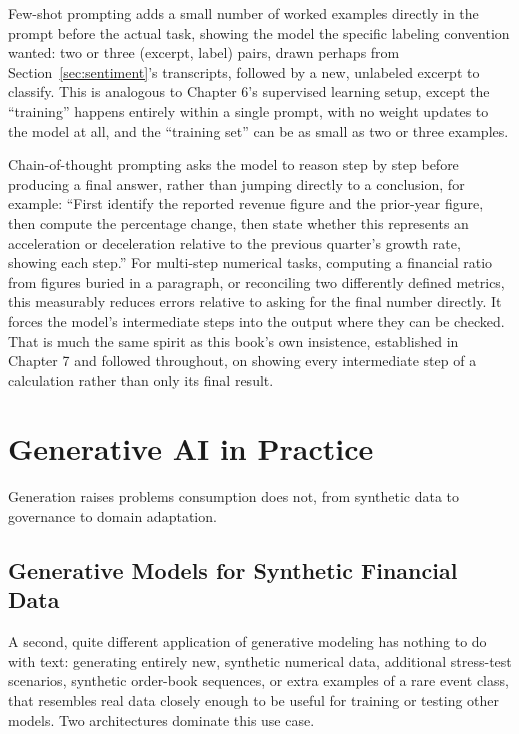\documentclass[../ai_in_finance]{subfiles}
\begin{document}
Few-shot prompting adds a small number of worked examples directly in the prompt before the actual task, showing the model the specific labeling convention wanted: two or three (excerpt, label) pairs, drawn perhaps from Section~\ref{sec:sentiment}'s transcripts, followed by a new, unlabeled excerpt to classify. This is analogous to Chapter 6's supervised learning setup, except the ``training'' happens entirely within a single prompt, with no weight updates to the model at all, and the ``training set'' can be as small as two or three examples.

Chain-of-thought prompting asks the model to reason step by step before producing a final answer, rather than jumping directly to a conclusion, for example: ``First identify the reported revenue figure and the prior-year figure, then compute the percentage change, then state whether this represents an acceleration or deceleration relative to the previous quarter's growth rate, showing each step.'' For multi-step numerical tasks, computing a financial ratio from figures buried in a paragraph, or reconciling two differently defined metrics, this measurably reduces errors relative to asking for the final number directly. It forces the model's intermediate steps into the output where they can be checked. That is much the same spirit as this book's own insistence, established in Chapter 7 and followed throughout, on showing every intermediate step of a calculation rather than only its final result.

\section{Generative AI in Practice}

Generation raises problems consumption does not, from synthetic data to governance to domain adaptation.

\subsection{Generative Models for Synthetic Financial Data}
\label{sec:generative-synthetic}

A second, quite different application of generative modeling has nothing to do with text: generating entirely new, synthetic numerical data, additional stress-test scenarios, synthetic order-book sequences, or extra examples of a rare event class, that resembles real data closely enough to be useful for training or testing other models. Two architectures dominate this use case.
\end{document}
